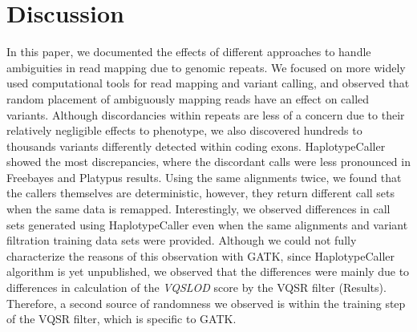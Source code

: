 \documentclass{bioinfo}
\newcommand{\junk}[1]{}
\begin{document}
\vspace*{-0.5cm}
\section{Discussion}

\junk{
The introduction of HTS platforms  quickly revolutionized the way we do biological research\citep{Mardis2008,Metzker2010}. Furthermore, HTS technology  already started to make impact on human health in the form of personalized medicine
through clinical sequencing~\citep{Biesecker2009}, breast cancer subtype detection~\citep{Bosdet2013}, and small molecule drug target site identification~\citep{Rodriguez2014}. However, both sequencing technologies themselves~\citep{Kavak2015},
 and the computational tools are still far from being mature in terms of accuracy~\citep{Alkan2011,Nielsen2011}. The complexity and repetitive nature of human genomes introduce further challenges for reliable characterization of genomic variants~\citep{Treangen2012}.
}

In this paper, we documented the effects of different approaches to handle ambiguities in read mapping due to genomic repeats. We focused on more widely used computational tools for read mapping and variant calling, and observed that random placement of ambiguously mapping reads have an effect on called variants. 
 Although discordancies within repeats are less of a concern due to their relatively negligible 
effects to phenotype, we also discovered hundreds to thousands variants differently detected within coding exons. HaplotypeCaller showed the most discrepancies, where the discordant calls were less pronounced in Freebayes and Platypus results. 
Using the same alignments twice, we found that the callers themselves are deterministic, however, they return different call sets when the same data is remapped.
Interestingly, we observed differences in call sets generated using HaplotypeCaller even when the same alignments and variant filtration training data sets were provided. Although we could not fully characterize the reasons
of this observation with GATK, since HaplotypeCaller algorithm is yet unpublished, we observed that the differences were
mainly due to differences in calculation of the {\it VQSLOD} score by the VQSR filter (Results). 
Therefore, a second source of randomness we observed is within the training step of the VQSR filter, which is specific to GATK.
\end{document}
